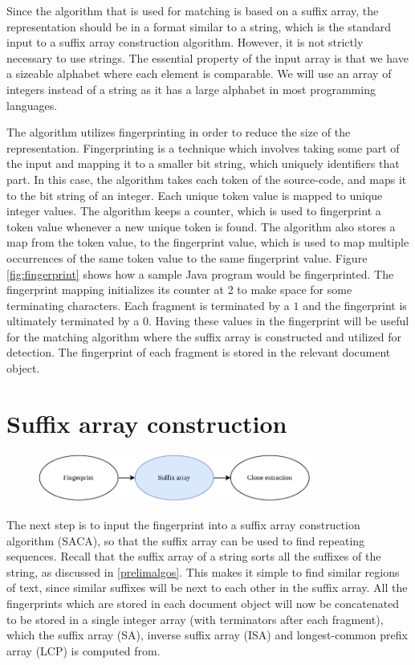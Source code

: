 Since the algorithm that is used for matching is based on a suffix array, the
representation should be in a format similar to a string, which is the standard input to a
suffix array construction algorithm. However, it is not strictly necessary to use strings.
The essential property of the input array is that we have a sizeable alphabet where each
element is comparable. We will use an array of integers instead of a string as it has a
large alphabet in most programming languages.

The algorithm utilizes fingerprinting in order to reduce the size of the representation.
Fingerprinting is a technique which involves taking some part of the input and mapping it
to a smaller bit string, which uniquely identifiers that part. In this case, the algorithm
takes each token of the source-code, and maps it to the bit string of an integer. Each
unique token value is mapped to unique integer values. The algorithm keeps a counter,
which is used to fingerprint a token value whenever a new unique token is found. The
algorithm also stores a map from the token value, to the fingerprint value, which is used
to map multiple occurrences of the same token value to the same fingerprint value. Figure
\ref{fig:fingerprint} shows how a sample Java program would be fingerprinted. The
fingerprint mapping initializes its counter at 2 to make space for some terminating
characters. Each fragment is terminated by a $1$ and the fingerprint is ultimately
terminated by a $0$. Having these values in the fingerprint will be useful for the
matching algorithm where the suffix array is constructed and utilized for detection. The
fingerprint of each fragment is stored in the relevant document object.

\section{Suffix array construction}

\begin{figure}[H]
    \begin{center}
        \includegraphics[width=0.8\textwidth]{figures/phases/phases_suffix.drawio.pdf}
    \end{center}
\end{figure}

The next step is to input the fingerprint into a suffix array construction algorithm
(SACA), so that the suffix array can be used to find repeating sequences. Recall that the
suffix array of a string sorts all the suffixes of the string, as discussed in
\cref{prelimalgos}. This makes it simple to find similar regions of text, since similar
suffixes will be next to each other in the suffix array. All the fingerprints which are
stored in each document object will now be concatenated to be stored in a single integer
array (with terminators after each fragment), which the suffix array (SA), inverse suffix
array (ISA) and longest-common prefix array (LCP) is computed from.

